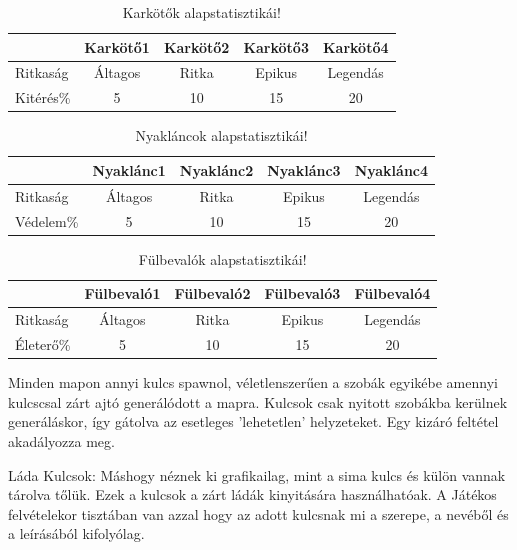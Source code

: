 \begin{table}[h]
\centering
\caption{Karkötők alapstatisztikái!}
\label{tab:minta}
\begin{tabular}{|l|c|c|c|c|}
\hline
 & Karkötő1 & Karkötő2 & Karkötő3 & Karkötő4  \\
\hline
Ritkaság & Áltagos & Ritka & Epikus & Legendás\\
\hline
Kitérés\% & 5 & 10 & 15 & 20 \\
\hline
\end{tabular}
\end{table}

\begin{table}[h]
\centering
\caption{Nyakláncok alapstatisztikái!}
\label{tab:minta}
\begin{tabular}{|l|c|c|c|c|}
\hline
 & Nyaklánc1 & Nyaklánc2 & Nyaklánc3 & Nyaklánc4  \\
\hline
Ritkaság & Áltagos & Ritka & Epikus & Legendás\\
\hline
Védelem\% & 5 & 10 & 15 & 20 \\
\hline
\end{tabular}
\end{table}

\begin{table}[h]
\centering
\caption{Fülbevalók alapstatisztikái!}
\label{tab:minta}
\begin{tabular}{|l|c|c|c|c|}
\hline
 & Fülbevaló1 & Fülbevaló2 & Fülbevaló3 & Fülbevaló4  \\
\hline
Ritkaság & Áltagos & Ritka & Epikus & Legendás\\
\hline
Életerő\% & 5 & 10 & 15 & 20 \\
\hline
\end{tabular}
\end{table}
\newpage


Minden mapon annyi kulcs spawnol, véletlenszerűen a szobák egyikébe amennyi kulcs\-csal zárt ajtó generálódott a mapra.
Kulcsok csak nyitott szobákba kerülnek generáláskor, így gátolva az esetleges 'lehetetlen' helyzeteket. Egy kizáró feltétel akadályozza meg.

Láda Kulcsok:
Máshogy néznek ki grafikailag, mint a sima kulcs és külön vannak tárolva tőlük. Ezek a kulcsok a zárt ládák kinyitására használhatóak.
A Játékos felvételekor tisztában van azzal hogy az adott kulcsnak mi a szerepe, a nevéből és a leírásából kifolyólag.

